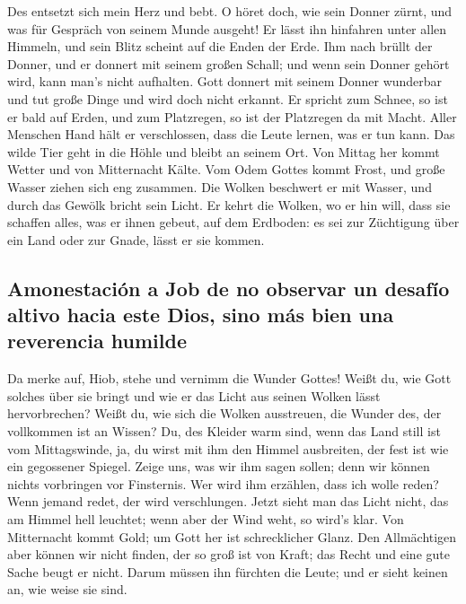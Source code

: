  Des entsetzt sich mein Herz und bebt.  O
höret doch, wie sein Donner zürnt, und was für Gespräch von seinem Munde
ausgeht!  Er lässt ihn hinfahren unter allen Himmeln, und
sein Blitz scheint auf die Enden der Erde.  Ihm nach
brüllt der Donner, und er donnert mit seinem großen Schall; und wenn
sein Donner gehört wird, kann man's nicht aufhalten.  Gott
donnert mit seinem Donner wunderbar und tut große Dinge und wird doch
nicht erkannt.  Er spricht zum Schnee, so ist er bald auf
Erden, und zum Platzregen, so ist der Platzregen da mit Macht.
 Aller Menschen Hand hält er verschlossen, dass die Leute
lernen, was er tun kann.  Das wilde Tier geht in die Höhle
und bleibt an seinem Ort.  Von Mittag her kommt Wetter und
von Mitternacht Kälte.  Vom Odem Gottes kommt Frost, und
große Wasser ziehen sich eng zusammen.  Die Wolken
beschwert er mit Wasser, und durch das Gewölk bricht sein Licht.
 Er kehrt die Wolken, wo er hin will, dass sie schaffen
alles, was er ihnen gebeut, auf dem Erdboden:  es sei zur
Züchtigung über ein Land oder zur Gnade, lässt er sie kommen.

\hypertarget{amonestaciuxf3n-a-job-de-no-observar-un-desafuxedo-altivo-hacia-este-dios-sino-muxe1s-bien-una-reverencia-humilde}{%
\subsection{Amonestación a Job de no observar un desafío altivo hacia
este Dios, sino más bien una reverencia
humilde}\label{amonestaciuxf3n-a-job-de-no-observar-un-desafuxedo-altivo-hacia-este-dios-sino-muxe1s-bien-una-reverencia-humilde}}

 Da merke auf, Hiob, stehe und vernimm die Wunder Gottes!
 Weißt du, wie Gott solches über sie bringt und wie er
das Licht aus seinen Wolken lässt hervorbrechen?  Weißt
du, wie sich die Wolken ausstreuen, die Wunder des, der vollkommen ist
an Wissen?  Du, des Kleider warm sind, wenn das Land
still ist vom Mittagswinde,  ja, du wirst mit ihm den
Himmel ausbreiten, der fest ist wie ein gegossener Spiegel.
 Zeige uns, was wir ihm sagen sollen; denn wir können
nichts vorbringen vor Finsternis.  Wer wird ihm erzählen,
dass ich wolle reden? Wenn jemand redet, der wird verschlungen.
 Jetzt sieht man das Licht nicht, das am Himmel hell
leuchtet; wenn aber der Wind weht, so wird's klar.  Von
Mitternacht kommt Gold; um Gott her ist schrecklicher Glanz.
 Den Allmächtigen aber können wir nicht finden, der so
groß ist von Kraft; das Recht und eine gute Sache beugt er nicht.
 Darum müssen ihn fürchten die Leute; und er sieht keinen
an, wie weise sie sind.

